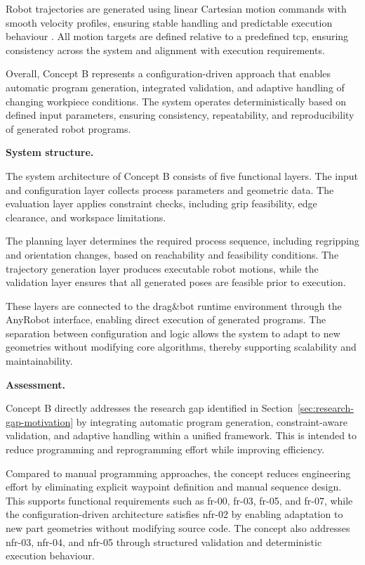 Robot trajectories are generated using linear Cartesian motion commands with smooth velocity profiles, ensuring stable handling and predictable execution behaviour \cite{Siciliano2016Robotics}. All motion targets are defined relative to a predefined \ac{tcp}, ensuring consistency across the system and alignment with execution requirements.

Overall, Concept B represents a configuration-driven approach that enables automatic program generation, integrated validation, and adaptive handling of changing workpiece conditions. The system operates deterministically based on defined input parameters, ensuring consistency, repeatability, and reproducibility of generated robot programs.

\label{sec:concept-b-system-structure}
\noindent\textbf{System structure.}

The system architecture of Concept B consists of five functional layers. The input and configuration layer collects process parameters and geometric data. The evaluation layer applies constraint checks, including grip feasibility, edge clearance, and workspace limitations.

The planning layer determines the required process sequence, including regripping and orientation changes, based on reachability and feasibility conditions. The trajectory generation layer produces executable robot motions, while the validation layer ensures that all generated poses are feasible prior to execution.

These layers are connected to the drag\&bot runtime environment through the AnyRobot interface, enabling direct execution of generated programs. The separation between configuration and logic allows the system to adapt to new geometries without modifying core algorithms, thereby supporting scalability and maintainability.

\label{sec:concept-b-critical-evaluation}
\noindent\textbf{Assessment.}

Concept B directly addresses the research gap identified in Section~\ref{sec:research-gap-motivation} by integrating automatic program generation, constraint-aware validation, and adaptive handling within a unified framework. This is intended to reduce programming and reprogramming effort while improving efficiency.

Compared to manual programming approaches, the concept reduces engineering effort by eliminating explicit waypoint definition and manual sequence design. This supports functional requirements such as \acs{fr}-00, \acs{fr}-03, \acs{fr}-05, and \acs{fr}-07, while the configuration-driven architecture satisfies \acs{nfr}-02 by enabling adaptation to new part geometries without modifying source code. The concept also addresses \acs{nfr}-03, \acs{nfr}-04, and \acs{nfr}-05 through structured validation and deterministic execution behaviour.

